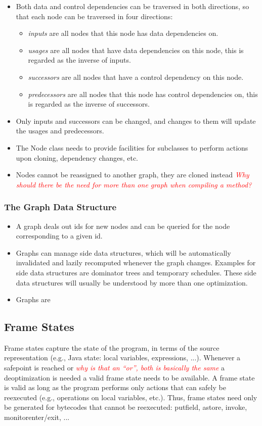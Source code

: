 \documentclass[twocolumn]{svjour3}
\newcommand{\mynote}[2]{
\textcolor{red}{\fbox{\bfseries\sffamily\scriptsize#1}
  {\small\textsf{\emph{#2}}}
\fbox{\bfseries\sffamily\scriptsize }}}
\newcommand\cw[1]{\mynote{CW}{#1}}
\begin{document}
\begin{itemize}
    \item Both data and control dependencies can be traversed in both directions, so that each node can be traversed in four directions:
    \begin{itemize}
        \item \emph{inputs} are all nodes that this node has data dependencies on.
        \item \emph{usages} are all nodes that have data dependencies on this node, this is regarded as the inverse of inputs.
        \item \emph{successors} are all nodes that have a control dependency on this node.
        \item \emph{predecessors} are all nodes that this node has control dependencies on, this is regarded as the inverse of successors.
    \end{itemize}
    \item Only inputs and successors can be changed, and changes to them will update the usages and predecessors.
    \item The Node class needs to provide facilities for subclasses to perform actions upon cloning, dependency changes, etc.
    \item Nodes cannot be reassigned to another graph, they are cloned instead \cw{Why should there be the need for more than one graph when compiling a method?}
\end{itemize}

\subsubsection{The Graph Data Structure}
\begin{itemize}
    \item A graph deals out ids for new nodes and can be queried for the node corresponding to a given id.
    \item Graphs can manage side data structures, which will be automatically invalidated and lazily recomputed whenever the graph changes. Examples for side data structures are dominator trees and temporary schedules. These side data structures will usually be understood by more than one optimization.
    \item Graphs are 
\end{itemize}

\subsection{Frame States}
Frame states capture the state of the program, in terms of the source representation (e.g., Java state: local variables, expressions, ...).
Whenever a safepoint is reached or \cw{why is that an ``or'', both is basically the same} a deoptimization is needed a valid frame state needs to be available.
A frame state is valid as long as the program performs only actions that can safely be reexecuted (e.g., operations on local variables, etc.).
Thus, frame states need only be generated for bytecodes that cannot be reexecuted: putfield, astore, invoke, monitorenter/exit, ...
\end{document}
